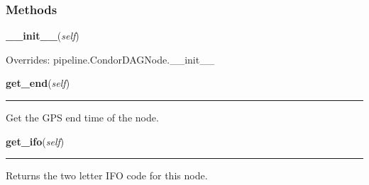   \subsubsection{Methods}

    \label{pipeline:AnalysisNode:__init__}
    \vspace{0.5ex}

    \noindent\begin{boxedminipage}{\textwidth}

    \raggedright \textbf{\_\_init\_\_}(\textit{self})

      Overrides: pipeline.CondorDAGNode.\_\_init\_\_

    \end{boxedminipage}

    \label{pipeline:AnalysisNode:get_end}
    \vspace{0.5ex}

    \noindent\begin{boxedminipage}{\textwidth}

    \raggedright \textbf{get\_end}(\textit{self})

    \vspace{-1.5ex}

    \rule{\textwidth}{0.5\fboxrule}
    Get the GPS end time of the node.

    \vspace{1ex}

    \end{boxedminipage}

    \label{pipeline:AnalysisNode:get_ifo}
    \vspace{0.5ex}

    \noindent\begin{boxedminipage}{\textwidth}

    \raggedright \textbf{get\_ifo}(\textit{self})

    \vspace{-1.5ex}

    \rule{\textwidth}{0.5\fboxrule}
    Returns the two letter IFO code for this node.

    \vspace{1ex}

    \end{boxedminipage}

